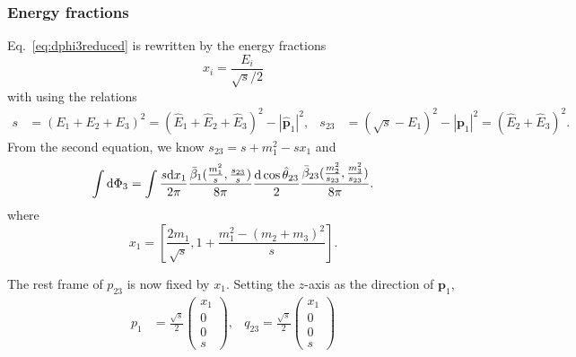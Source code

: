 \documentclass[10pt,a4paper]{article}
\newcommand{\pmat}[1]{\begin{pmatrix}#1\end{pmatrix}}
\newcommand{\dd}{{\rm d}}
\newcommand{\vc}[1]{{\boldsymbol{#1}}}
\begin{document}
\subsubsection{Energy fractions}
Eq.~\eqref{eq:dphi3reduced} is rewritten by the energy fractions
\begin{equation}
 x_i = \frac{E_i}{\sqrt{s}/2}
\end{equation}
with using the relations
\begin{align}
 s &= (E_1+E_2+E_3)^2 = (\hat E_1+\hat E_2+\hat E_3)^2-|\hat {\vc p}_1|^2,
 &
 s_{23} &= (\sqrt{s}-E_1)^2-|\vc p_1|^2 = (\hat E_2+\hat E_3)^2.
\end{align}
From the second equation, we know $s_{23}=s+m_1^2-s x_1$ and
\begin{equation}
   \int\dd\Phi_3
   =\int
   \frac{s \dd x_1}{2\pi}
   \frac{\bar\beta_1(\frac{m_1^2}{s},\frac{s_{23}}{s})}{8\pi}
   \frac{\dd\cos\hat\theta_{23}}{2}
   \frac{\bar\beta_{23}(\frac{m_2^2}{s_{23}},\frac{m_3^2}{s_{23}})}{8\pi}.
\end{equation}
where
\begin{equation}
 x_1=\left[\frac{2m_1}{\sqrt s}, 1+\frac{m_1^2-(m_2+m_3)^2}{s}\right].
\end{equation}

The rest frame of $p_{23}$ is now fixed by $x_1$. Setting the $z$-axis as the direction of $\vc p_1$,
\begin{align}
 p_1 &= \frac{\sqrt s}{2}\pmat{x_1\\ 0 \\ 0 \\s},
& q_{23} = \frac{\sqrt s}{2}\pmat{x_1\\ 0 \\ 0 \\s}
\end{align}
\end{document}
